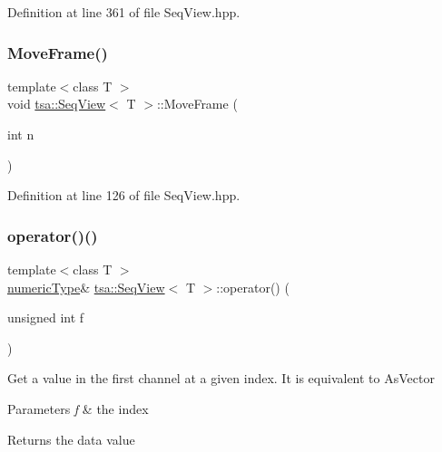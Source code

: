 Definition at line 361 of file Seq\+View.\+hpp.

\mbox{\label{classtsa_1_1_seq_view_aa8e6396dfafee7ef74d686ca57bd73b9}} 
\subsubsection{\texorpdfstring{Move\+Frame()}{MoveFrame()}}
{\footnotesize\ttfamily template$<$class T $>$ \\
void \hyperlink{classtsa_1_1_seq_view}{tsa\+::\+Seq\+View}$<$ T $>$\+::Move\+Frame (\begin{DoxyParamCaption}\item[{int}]{n }\end{DoxyParamCaption})\hspace{0.3cm}{\ttfamily [inline]}}



Definition at line 126 of file Seq\+View.\+hpp.

\mbox{\label{classtsa_1_1_seq_view_a59cc4be1619fb557ddadf7d0bf5cdcc6}} 
\subsubsection{\texorpdfstring{operator()()}{operator()()}\hspace{0.1cm}{\footnotesize\ttfamily [1/2]}}
{\footnotesize\ttfamily template$<$class T $>$ \\
\hyperlink{classtsa_1_1_seq_view_a72b689db78d0feea3305e62cc3852a1d}{numeric\+Type}\& \hyperlink{classtsa_1_1_seq_view}{tsa\+::\+Seq\+View}$<$ T $>$\+::operator() (\begin{DoxyParamCaption}\item[{unsigned int}]{f }\end{DoxyParamCaption})\hspace{0.3cm}{\ttfamily [inline]}}

Get a value in the first channel at a given index. It is equivalent to As\+Vector


\begin{DoxyParams}{Parameters}
{\em f} & the index\\
\hline
\end{DoxyParams}
\begin{DoxyReturn}{Returns}
the data value 
\end{DoxyReturn}


